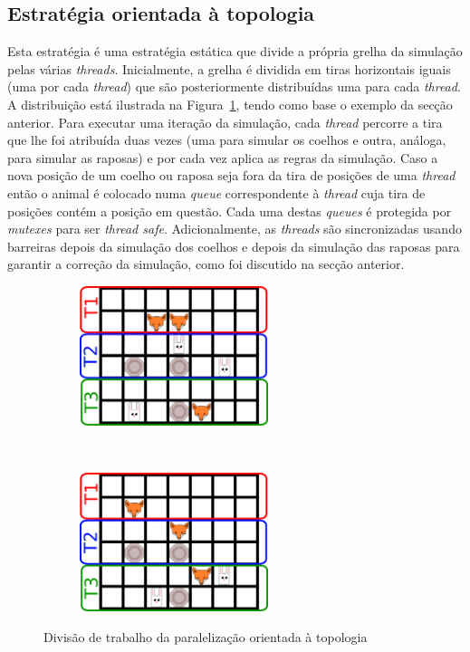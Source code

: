 \documentclass[10pt,a4paper,oneside]{article}
\begin{document}
\subsection{Estratégia orientada à topologia}
Esta estratégia é uma estratégia estática que divide a própria grelha
da simulação pelas várias \textit{threads}. Inicialmente, a grelha é
dividida em tiras horizontais iguais (uma por cada \textit{thread})
que são posteriormente distribuídas uma para cada \textit{thread}. A
distribuição está ilustrada na Figura~\ref{fig:par1}, tendo como base
o exemplo da secção anterior. Para executar uma iteração da simulação,
cada \textit{thread} percorre a tira que lhe foi atribuída duas vezes
(uma para simular os coelhos e outra, análoga, para simular as
raposas) e por cada vez aplica as regras da simulação. Caso a nova
posição de um coelho ou raposa seja fora da tira de posições de uma
\textit{thread} então o animal é colocado numa \textit{queue}
correspondente à \textit{thread} cuja tira de posições contém a
posição em questão. Cada uma destas \textit{queues} é protegida por
\textit{mutexes} para ser \textit{thread safe}. Adicionalmente, as
\textit{threads} são sincronizadas usando barreiras depois da
simulação dos coelhos e depois da simulação das raposas para garantir
a correção da simulação, como foi discutido na secção anterior.

\begin{figure}[H]
    \centering
    \begin{subfigure}[b]{0.4\textwidth}
      \centering
      \includegraphics[height=1.6in]{grid1_par1.png}
    \end{subfigure}
    ~
    \begin{subfigure}[b]{0.4\textwidth}
      \centering
      \includegraphics[height=1.6in]{grid2_par1.png}
    \end{subfigure}
    \caption{Divisão de trabalho da paralelização orientada à topologia}
    \label{fig:par1}
\end{figure}
\end{document}
